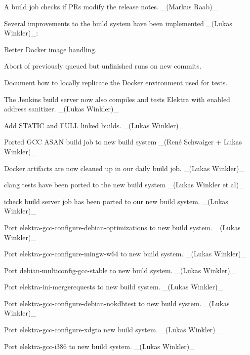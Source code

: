 \begin{DoxyItemize}
\item A build job checks if P\+Rs modify the release notes. \+\_\+(\+Markus Raab)\+\_\+
\item Several improvements to the build system have been implemented \+\_\+(\+Lukas Winkler)\+\_\+\+:
\begin{DoxyItemize}
\item Better Docker image handling.
\item Abort of previously queued but unfinished runs on new commits.
\item Document how to locally replicate the Docker environment used for tests.
\end{DoxyItemize}
\item The Jenkins build server now also compiles and tests Elektra with enabled address sanitizer. \+\_\+(\+Lukas Winkler)\+\_\+
\item Add {\ttfamily S\+T\+A\+T\+IC} and {\ttfamily F\+U\+LL} linked builds. \+\_\+(\+Lukas Winkler)\+\_\+
\item Ported G\+CC A\+S\+AN build job to new build system \+\_\+(René Schwaiger + Lukas Winkler)\+\_\+
\item Docker artifacts are now cleaned up in our daily build job. \+\_\+(\+Lukas Winkler)\+\_\+
\item {\ttfamily clang} tests have been ported to the new build system \+\_\+(\+Lukas Winkler et al)\+\_\+
\item {\ttfamily icheck} build server job has been ported to our new build system. \+\_\+(\+Lukas Winkler)\+\_\+
\item Port {\ttfamily elektra-\/gcc-\/configure-\/debian-\/optimizations} to new build system. \+\_\+(\+Lukas Winkler)\+\_\+
\item Port {\ttfamily elektra-\/gcc-\/configure-\/mingw-\/w64} to new build system. \+\_\+(\+Lukas Winkler)\+\_\+
\item Port {\ttfamily debian-\/multiconfig-\/gcc-\/stable} to new build system. \+\_\+(\+Lukas Winkler)\+\_\+
\item Port {\ttfamily elektra-\/ini-\/mergerequests} to new build system. \+\_\+(\+Lukas Winkler)\+\_\+
\item Port {\ttfamily elektra-\/gcc-\/configure-\/debian-\/nokdbtest} to new build system. \+\_\+(\+Lukas Winkler)\+\_\+
\item Port {\ttfamily elektra-\/gcc-\/configure-\/xdg}to new build system. \+\_\+(\+Lukas Winkler)\+\_\+
\item Port {\ttfamily elektra-\/gcc-\/i386} to new build system. \+\_\+(\+Lukas Winkler)\+\_\+

\end{DoxyItemize}
